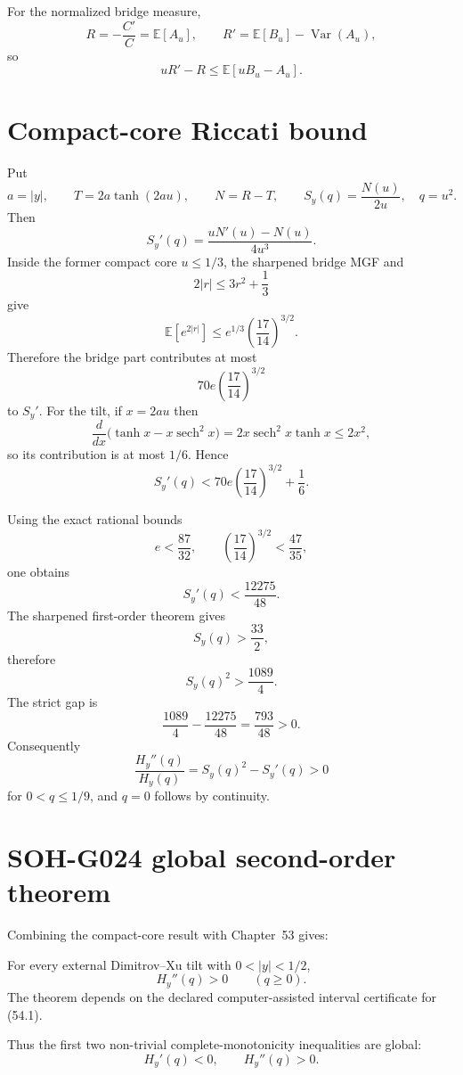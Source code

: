 For the normalized bridge measure,
\[
 R=-\frac{C'}C=\mathbb E[A_u],
 \qquad
 R'=\mathbb E[B_u]-\operatorname{Var}(A_u),
\]
so
\[
 \boxed{uR'-R\le\mathbb E[uB_u-A_u].}
\]

\section{Compact-core Riccati bound}

Put
\[
 a=|y|,
 \qquad
 T=2a\tanh(2au),
 \qquad
 N=R-T,
 \qquad
 S_y(q)=\frac{N(u)}{2u},\quad q=u^2.
\]
Then
\[
 S_y'(q)=\frac{uN'(u)-N(u)}{4u^3}.
\]
Inside the former compact core $u\le1/3$, the sharpened bridge MGF and
\[
 2|r|\le3r^2+\frac13
\]
give
\[
 \mathbb E[e^{2|r|}]
 \le e^{1/3}\left(\frac{17}{14}\right)^{3/2}.
\]
Therefore the bridge part contributes at most
\[
 70e\left(\frac{17}{14}\right)^{3/2}
\]
to $S_y'$. For the tilt, if $x=2au$ then
\[
 \frac{d}{dx}\bigl(\tanh x-x\operatorname{sech}^2x\bigr)
 =2x\operatorname{sech}^2x\tanh x\le2x^2,
\]
so its contribution is at most $1/6$. Hence
\[
 S_y'(q)
 <70e\left(\frac{17}{14}\right)^{3/2}+\frac16.
\]

Using the exact rational bounds
\[
 e<\frac{87}{32},
 \qquad
 \left(\frac{17}{14}\right)^{3/2}<\frac{47}{35},
\]
one obtains
\[
 \boxed{S_y'(q)<\frac{12275}{48}.}
\]
The sharpened first-order theorem gives
\[
 \boxed{S_y(q)>\frac{33}{2}},
\]
therefore
\[
 S_y(q)^2>\frac{1089}{4}.
\]
The strict gap is
\[
 \boxed{
 \frac{1089}{4}-\frac{12275}{48}
 =\frac{793}{48}>0.
 }
\]
Consequently
\[
 \boxed{
 \frac{H_y''(q)}{H_y(q)}
 =S_y(q)^2-S_y'(q)>0
 }
\]
for $0<q\le1/9$, and $q=0$ follows by continuity.

\section{SOH-G024 global second-order theorem}

Combining the compact-core result with Chapter~53 gives:

\begin{theorem}
For every external Dimitrov--Xu tilt with $0<|y|<1/2$,
\[
 \boxed{H_y''(q)>0\qquad(q\ge0).}
\]
The theorem depends on the declared computer-assisted interval certificate for (54.1).
\end{theorem}

Thus the first two non-trivial complete-monotonicity inequalities are global:
\[
 \boxed{H_y'(q)<0},
 \qquad
 \boxed{H_y''(q)>0}.
\]

